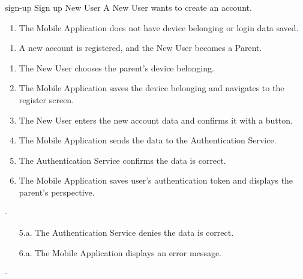 {sign-up}
{Sign up}
{New User}
{A New User wants to create an account.}
{\begin{enumerate} %
    \item The Mobile Application does not have device belonging or login data saved.
\end{enumerate}}
{\begin{enumerate} %
   \item A new account is registered, and the New User becomes a Parent.
\end{enumerate}}
{\begin{enumerate} %
   \item The New User chooses the parent's device belonging.
   \item The Mobile Application saves the device belonging and navigates to the register screen.
   \item The New User enters the new account data and confirms it with a button.
   \item The Mobile Application sends the data to the Authentication Service.
   \item The Authentication Service confirms the data is correct.
   \item The Mobile Application saves user's authentication token and displays the parent's perspective.
\end{enumerate}}
{-} %
{\begin{enumerate} %
    \item[5.a.] The Authentication Service denies the data is correct.
    \item[6.a.] The Mobile Application displays an error message.
\end{enumerate}}
{-} %
